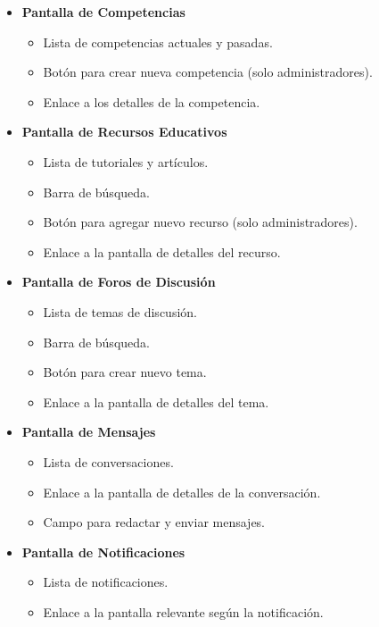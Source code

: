\begin{itemize}
    \item \textbf{Pantalla de Competencias}
    \begin{itemize}
        \item Lista de competencias actuales y pasadas.
        \item Botón para crear nueva competencia (solo administradores).
        \item Enlace a los detalles de la competencia.
    \end{itemize}

    \item \textbf{Pantalla de Recursos Educativos}
    \begin{itemize}
        \item Lista de tutoriales y artículos.
        \item Barra de búsqueda.
        \item Botón para agregar nuevo recurso (solo administradores).
        \item Enlace a la pantalla de detalles del recurso.
    \end{itemize}

    \item \textbf{Pantalla de Foros de Discusión}
    \begin{itemize}
        \item Lista de temas de discusión.
        \item Barra de búsqueda.
        \item Botón para crear nuevo tema.
        \item Enlace a la pantalla de detalles del tema.
    \end{itemize}

    \item \textbf{Pantalla de Mensajes}
    \begin{itemize}
        \item Lista de conversaciones.
        \item Enlace a la pantalla de detalles de la conversación.
        \item Campo para redactar y enviar mensajes.
    \end{itemize}

    \item \textbf{Pantalla de Notificaciones}
    \begin{itemize}
        \item Lista de notificaciones.
        \item Enlace a la pantalla relevante según la notificación.
    \end{itemize}
\end{itemize}

